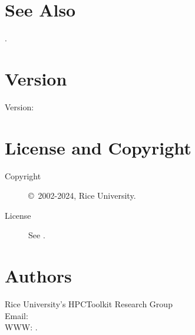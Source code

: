 \documentclass[english]{article}
\begin{document}

\section{See Also}

.

\section{Version}

Version: \Version

\section{License and Copyright}

\begin{description}
\item[Copyright] \copyright\ 2002-2024, Rice University.
\item[License] See .
\end{description}

\section{Authors}

\noindent
Rice University's HPCToolkit Research Group \\
Email:  \\
WWW: .

\LatexManEnd
\end{document}

